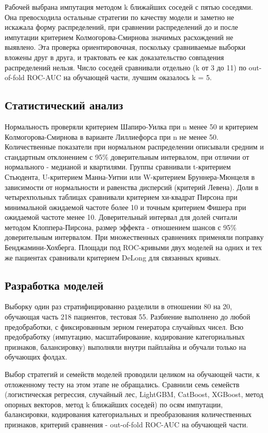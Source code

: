 \documentclass[pdflatex,sn-basic,Numbered]{sn-jnl}
\begin{document}
Рабочей выбрана импутация методом k ближайших соседей с пятью соседями. Она превосходила остальные стратегии по качеству модели и заметно не искажала форму распределений, при сравнении распределений до и после импутации критерием Колмогорова-Смирнова значимых расхождений не выявлено. Эта проверка ориентировочная, поскольку сравниваемые выборки вложены друг в друга, и трактовать ее как доказательство совпадения распределений нельзя. Число соседей сравнивали отдельно (k от 3 до 11) по out-of-fold ROC-AUC на обучающей части, лучшим оказалось k = 5.

\subsection{Статистический анализ}\label{subsec2_7}

Нормальность проверяли критерием Шапиро-Уилка при n менее 50 и критерием Колмогорова-Смирнова в варианте Лиллиефорса при n не менее 50. Количественные показатели при нормальном распределении описывали средним и стандартным отклонением с 95\% доверительным интервалом, при отличии от нормального - медианой и квартилями. Группы сравнивали t-критерием Стьюдента, U-критерием Манна-Уитни или W-критерием Бруннера-Мюнцеля в зависимости от нормальности и равенства дисперсий (критерий Левена). Доли в четырехпольных таблицах сравнивали критерием хи-квадрат Пирсона при минимальной ожидаемой частоте более 10 и точным критерием Фишера при ожидаемой частоте менее 10. Доверительный интервал для долей считали методом Клоппера-Пирсона, размер эффекта - отношением шансов с 95\% доверительным интервалом. При множественных сравнениях применяли поправку Бенджамини-Хохберга. Площади под ROC-кривыми двух моделей на одних и тех же пациентах сравнивали критерием DeLong для связанных кривых.

\subsection{Разработка моделей}\label{subsec2_8}

Выборку один раз стратифицированно разделили в отношении 80 на 20, обучающая часть 218 пациентов, тестовая 55. Разбиение выполнено до любой предобработки, с фиксированным зерном генератора случайных чисел. Всю предобработку (импутацию, масштабирование, кодирование категориальных признаков, балансировку) выполняли внутри пайплайна и обучали только на обучающих фолдах.

Выбор стратегий и семейств моделей проводили целиком на обучающей части, к отложенному тесту на этом этапе не обращались. Сравнили семь семейств (логистическая регрессия, случайный лес, LightGBM, CatBoost, XGBoost, метод опорных векторов, метод k ближайших соседей) по осям импутации, балансировки, кодирования категориальных и преобразования количественных признаков, критерий сравнения - out-of-fold ROC-AUC на обучающей части.
\end{document}
